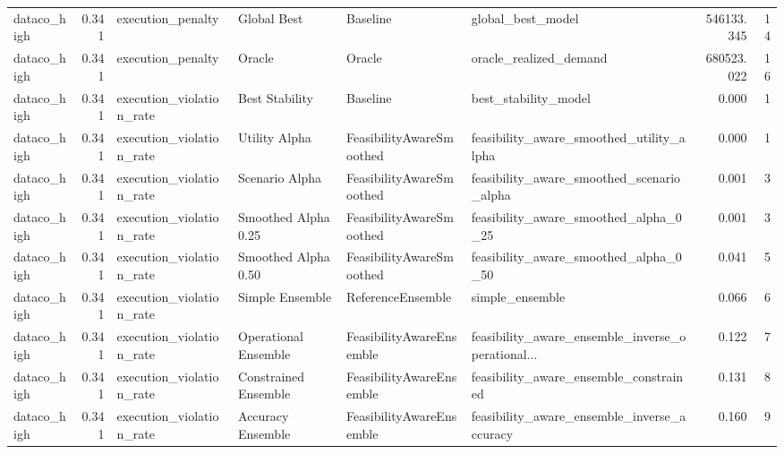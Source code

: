 \begin{table}
{\begin{tabular}{lrllllrr}
   dataco\_high &             0.341 &           execution\_penalty &           Global Best &                  Baseline &                                  global\_best\_model &    546133.345 &              14 \\
   dataco\_high &             0.341 &           execution\_penalty &                Oracle &                    Oracle &                             oracle\_realized\_demand &    680523.022 &              16 \\
   dataco\_high &             0.341 &    execution\_violation\_rate &        Best Stability &                  Baseline &                               best\_stability\_model &         0.000 &               1 \\
   dataco\_high &             0.341 &    execution\_violation\_rate &         Utility Alpha &  FeasibilityAwareSmoothed &           feasibility\_aware\_smoothed\_utility\_alpha &         0.000 &               1 \\
   dataco\_high &             0.341 &    execution\_violation\_rate &        Scenario Alpha &  FeasibilityAwareSmoothed &          feasibility\_aware\_smoothed\_scenario\_alpha &         0.001 &               3 \\
   dataco\_high &             0.341 &    execution\_violation\_rate &   Smoothed Alpha 0.25 &  FeasibilityAwareSmoothed &              feasibility\_aware\_smoothed\_alpha\_0\_25 &         0.001 &               3 \\
   dataco\_high &             0.341 &    execution\_violation\_rate &   Smoothed Alpha 0.50 &  FeasibilityAwareSmoothed &              feasibility\_aware\_smoothed\_alpha\_0\_50 &         0.041 &               5 \\
   dataco\_high &             0.341 &    execution\_violation\_rate &       Simple Ensemble &         ReferenceEnsemble &                                    simple\_ensemble &         0.066 &               6 \\
   dataco\_high &             0.341 &    execution\_violation\_rate &  Operational Ensemble &  FeasibilityAwareEnsemble &  feasibility\_aware\_ensemble\_inverse\_operational... &         0.122 &               7 \\
   dataco\_high &             0.341 &    execution\_violation\_rate &  Constrained Ensemble &  FeasibilityAwareEnsemble &             feasibility\_aware\_ensemble\_constrained &         0.131 &               8 \\
   dataco\_high &             0.341 &    execution\_violation\_rate &     Accuracy Ensemble &  FeasibilityAwareEnsemble &        feasibility\_aware\_ensemble\_inverse\_accuracy &         0.160 &               9 \\

\end{tabular}}
\end{table}
